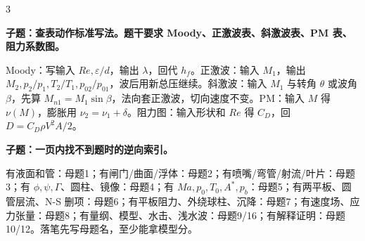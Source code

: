 \documentclass[a4paper]{article}
\newcommand{\qt}[1]{\vspace{0.10pt}\colorbox{Q}{\parbox{\dimexpr\linewidth-2\fboxsep}{\color{white}\bfseries #1}}\par}
\newcommand{\ans}[1]{\colorbox{G}{\parbox{\dimexpr\linewidth-2\fboxsep}{#1}}\par}
\begin{document}
\begin{multicols}{3}
\qt{子题：查表动作标准写法。题干要求 Moody、正激波表、斜激波表、PM 表、阻力系数图。}
\ans{Moody：写输入 $Re,\varepsilon/d$，输出 $\lambda$，回代 $h_f$。正激波：输入 $M_1$，输出 $M_2,p_2/p_1,T_2/T_1,p_{02}/p_{01}$，波后用新总压继续。斜激波：输入 $M_1$ 与转角 $\theta$ 或波角 $\beta$，先算 $M_{n1}=M_1\sin\beta$，法向套正激波，切向速度不变。PM：输入 $M$ 得 $\nu(M)$，膨胀用 $\nu_2=\nu_1+\delta$。阻力图：输入形状和 $Re$ 得 $C_D$，回 $D=C_D\rho V^2A/2$。}
\qt{子题：一页内找不到题时的逆向索引。}
\ans{有液面和管：母题1；有闸门/曲面/浮体：母题2；有喷嘴/弯管/射流/叶片：母题3；有 $\phi,\psi,\Gamma$、圆柱、镜像：母题4；有 $Ma,p_0,T_0,A^*,p_b$：母题5；有两平板、圆管层流、N-S 删项：母题6；有平板阻力、外绕球柱、沉降：母题7；有速度场、应力张量：母题8；有量纲、模型、水击、浅水波：母题9/16；有解释证明：母题10/12。落笔先写母题名，至少能拿模型分。}


\end{multicols}
\end{document}

